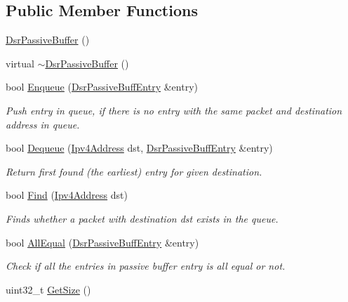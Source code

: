 \subsection*{Public Member Functions}
\begin{DoxyCompactItemize}
\item 
\hyperlink{classns3_1_1dsr_1_1DsrPassiveBuffer_aa83f79c5f71e9d30f2e389d534faa2d0}{Dsr\+Passive\+Buffer} ()
\item 
virtual \hyperlink{classns3_1_1dsr_1_1DsrPassiveBuffer_a01963410dff707649ba28472df883f3f}{$\sim$\+Dsr\+Passive\+Buffer} ()
\item 
bool \hyperlink{classns3_1_1dsr_1_1DsrPassiveBuffer_a18813680df0977c44e6901f79849d45d}{Enqueue} (\hyperlink{classns3_1_1dsr_1_1DsrPassiveBuffEntry}{Dsr\+Passive\+Buff\+Entry} \&entry)
\begin{DoxyCompactList}\small\item\em Push entry in queue, if there is no entry with the same packet and destination address in queue. \end{DoxyCompactList}\item 
bool \hyperlink{classns3_1_1dsr_1_1DsrPassiveBuffer_a4d52aae9c0ed66c17a8397d9fc855a5a}{Dequeue} (\hyperlink{classns3_1_1Ipv4Address}{Ipv4\+Address} dst, \hyperlink{classns3_1_1dsr_1_1DsrPassiveBuffEntry}{Dsr\+Passive\+Buff\+Entry} \&entry)
\begin{DoxyCompactList}\small\item\em Return first found (the earliest) entry for given destination. \end{DoxyCompactList}\item 
bool \hyperlink{classns3_1_1dsr_1_1DsrPassiveBuffer_a42cbce7c3b45e25537c3e368e26de17b}{Find} (\hyperlink{classns3_1_1Ipv4Address}{Ipv4\+Address} dst)
\begin{DoxyCompactList}\small\item\em Finds whether a packet with destination dst exists in the queue. \end{DoxyCompactList}\item 
bool \hyperlink{classns3_1_1dsr_1_1DsrPassiveBuffer_af87acdf99b1ff181b4ffc4376e32c1f6}{All\+Equal} (\hyperlink{classns3_1_1dsr_1_1DsrPassiveBuffEntry}{Dsr\+Passive\+Buff\+Entry} \&entry)
\begin{DoxyCompactList}\small\item\em Check if all the entries in passive buffer entry is all equal or not. \end{DoxyCompactList}\item 
uint32\+\_\+t \hyperlink{classns3_1_1dsr_1_1DsrPassiveBuffer_a1c636b64110e7323c4fad1d755112317}{Get\+Size} ()

\end{DoxyCompactItemize}
